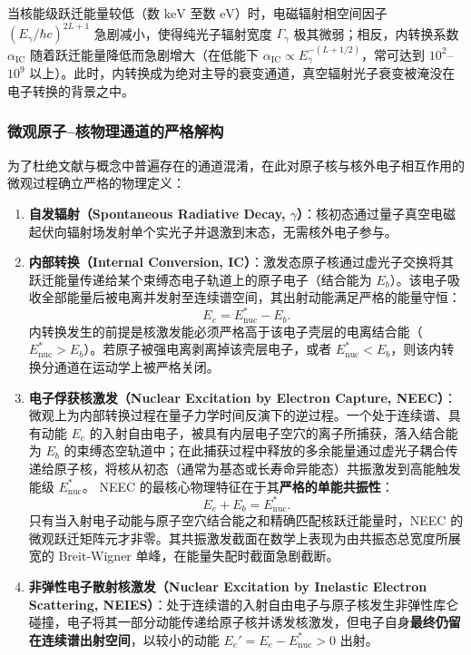 当核能级跃迁能量较低（数 $\mathrm{keV}$ 至数 $\mathrm{eV}$）时，电磁辐射相空间因子 $(E_\gamma / \hbar c)^{2L+1}$ 急剧减小，使得纯光子辐射宽度 $\Gamma_\gamma$ 极其微弱；相反，内转换系数 $\alpha_{\mathrm{IC}}$ 随着跃迁能量降低而急剧增大（在低能下 $\alpha_{\mathrm{IC}} \propto E_\gamma^{-(L+1/2)}$，常可达到 $10^2$--$10^9$ 以上）。此时，内转换成为绝对主导的衰变通道，真空辐射光子衰变被淹没在电子转换的背景之中。

\subsubsection{微观原子--核物理通道的严格解构}

为了杜绝文献与概念中普遍存在的通道混淆，在此对原子核与核外电子相互作用的微观过程确立严格的物理定义：
\begin{enumerate}
\item \textbf{自发辐射（Spontaneous Radiative Decay, $\gamma$）}：核初态通过量子真空电磁起伏向辐射场发射单个实光子并退激到末态，无需核外电子参与。
\item \textbf{内部转换（Internal Conversion, IC）}：激发态原子核通过虚光子交换将其跃迁能量传递给某个束缚态电子轨道上的原子电子（结合能为 $E_b$）。该电子吸收全部能量后被电离并发射至连续谱空间，其出射动能满足严格的能量守恒：
\begin{equation}\label{eq:4-8-ic-energy-cons}
E_e = E_{\mathrm{nuc}}^* - E_b.
\end{equation}
内转换发生的前提是核激发能必须严格高于该电子壳层的电离结合能（$E_{\mathrm{nuc}}^* > E_b$）。若原子被强电离剥离掉该壳层电子，或者 $E_{\mathrm{nuc}}^* < E_b$，则该内转换分通道在运动学上被严格关闭。
\item \textbf{电子俘获核激发（Nuclear Excitation by Electron Capture, NEEC）}：微观上为内部转换过程在量子力学时间反演下的逆过程。一个处于连续谱、具有动能 $E_e$ 的入射自由电子，被具有内层电子空穴的离子所捕获，落入结合能为 $E_b$ 的束缚态空轨道中；在此捕获过程中释放的多余能量通过虚光子耦合传递给原子核，将核从初态（通常为基态或长寿命异能态）共振激发到高能触发能级 $E_{\mathrm{nuc}}^*$。
NEEC 的最核心物理特征在于其\textbf{严格的单能共振性}：
\begin{equation}\label{eq:4-8-neec-resonance-cond}
E_e + E_b = E_{\mathrm{nuc}}^*.
\end{equation}
只有当入射电子动能与原子空穴结合能之和精确匹配核跃迁能量时，NEEC 的微观跃迁矩阵元才非零。其共振激发截面在数学上表现为由共振态总宽度所展宽的 Breit-Wigner 单峰，在能量失配时截面急剧截断。
\item \textbf{非弹性电子散射核激发（Nuclear Excitation by Inelastic Electron Scattering, NEIES）}：处于连续谱的入射自由电子与原子核发生非弹性库仑碰撞，电子将其一部分动能传递给原子核并诱发核激发，但电子自身\textbf{最终仍留在连续谱出射空间}，以较小的动能 $E_e' = E_e - E_{\mathrm{nuc}}^* > 0$ 出射。

\end{enumerate}
